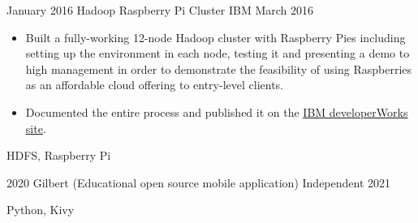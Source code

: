 \begin{projects}
    \emptySeparator

    \project
        {January 2016}
        {Hadoop Raspberry Pi Cluster}
        {IBM}
        {March 2016}
        {
            \begin{itemize}
                \item Built a fully-working 12-node Hadoop cluster with 
                    Raspberry Pies including setting up the environment in each 
                    node, testing it and presenting a demo to high management 
                    in order to demonstrate the feasibility of using 
                    Raspberries as an affordable cloud offering to entry-level 
                    clients.
                \item Documented the entire process and published it on the 
                    \href{https://developer.ibm.com/recipes/tutorials/building-a-hadoop-cluster-with-raspberry-pi/}
                    {\underline{IBM developerWorks site}}.
            \end{itemize}
        }
        {
            HDFS,
            Raspberry Pi
        }

    \emptySeparator

    \project
        {2020}
        {Gilbert (Educational open source mobile application)}
        {Independent}
        {2021}
        {
            \begin{itemize}
                \item \href{{https://github.com/alanverdugo/gilbert}{\underline{Built}} a
                    mobile application aimed at helping college students
                    to learn about electricity and magnetism topics.
                \item Documented and
                    \href{https://play.google.com/store/apps/details?id=net.kippel.gilbert}
                    {\underline{published}} the entire application as free and open
                    source software.
            \end{itemize}
        }
        {
            Python,
            Kivy
        }



\end{projects}
